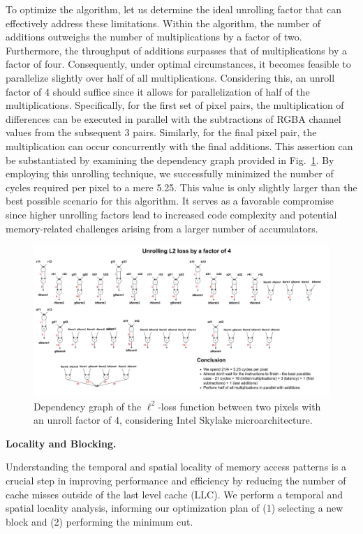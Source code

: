 \documentclass[letterpaper]{article}
\newcommand{\mypar}[1]{{\bf #1.}}
\begin{document}
To optimize the algorithm, let us determine the ideal unrolling factor that can effectively address these limitations. Within the algorithm, the number of additions outweighs the number of multiplications by a factor of two. Furthermore, the throughput of additions surpasses that of multiplications by a factor of four. Consequently, under optimal circumstances, it becomes feasible to parallelize slightly over half of all multiplications. Considering this, an unroll factor of 4 should suffice since it allows for parallelization of half of the multiplications. Specifically, for the first set of pixel pairs, the multiplication of differences can be executed in parallel with the subtractions of RGBA channel values from the subsequent 3 pairs. Similarly, for the final pixel pair, the multiplication can occur concurrently with the final additions. This assertion can be substantiated by examining the dependency graph provided in Fig.~\ref{unroll}. By employing this unrolling technique, we successfully minimized the number of cycles required per pixel to a mere 5.25. This value is only slightly larger than the best possible scenario for this algorithm. It serves as a favorable compromise since higher unrolling factors lead to increased code complexity and potential memory-related challenges arising from a larger number of accumulators.

\begin{figure}[htb]
\centering
  \includegraphics[scale=0.18]{Unrolling.pdf}
  \caption{Dependency graph of the $\ell^2$-loss function between two pixels with an unroll factor of 4, considering Intel Skylake microarchitecture.\label{unroll}}
\end{figure}

\mypar{Locality and Blocking}

Understanding the temporal and spatial locality of memory access patterns is a crucial step in improving performance and efficiency by reducing the number of cache misses outside of the last level cache (LLC). We perform a temporal and spatial locality analysis, informing our optimization plan of (1) selecting a new block and (2) performing the minimum cut. 
\end{document}
